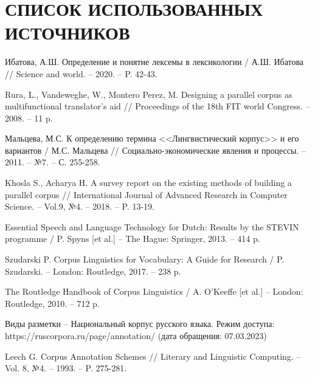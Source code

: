 \section*{СПИСОК ИСПОЛЬЗОВАННЫХ ИСТОЧНИКОВ}

\begingroup
\renewcommand{\section}[2]{}
\begin{thebibliography}{}
	Ибатова, А.Ш. Определение и понятие лексемы в лексикологии / А.Ш. Ибатова // Science and world. -- 2020. -- P. 42-43.
	
	Rura, L., Vandeweghe, W., Montero Perez, M. Designing a parallel corpus as multifunctional translator's aid // Proceedings of the 18th FIT world Congress. -- 2008. -- 11 p.
	
	Мальцева, М.С. К определению термина <<Лингвистический корпус>> и его вариантов / М.С. Мальцева // Социально-экономические явления и процессы. -- 2011. -- №7. -- С. 255-258.
	
	Khosla S., Acharya H. A survey report on the existing methods of building a parallel corpus // International Journal of Advanced Research in Computer Science. -- Vol.9, №4. -- 2018. -- P. 13-19.
	
	Essential Speech and Language Technology for Dutch: Results by the STEVIN programme / P. Spyns [et al.] -- The Hague: Springer, 2013. -- 414 p.
	
	Szudarski P. Corpus Linguistics for Vocabulary: A Guide for Research / P. Szudarski. -- London: Routledge, 2017. -- 238 p.
	
	The Routledge Handbook of Corpus Linguistics / A. O'Keeffe [et al.] -- London: Routledge, 2010. -- 712 p.
	
	Виды разметки -- Национальный корпус русского языка. Режим доступа: https://ruscorpora.ru/page/annotation/ (дата обращения: 07.03.2023)
	
	Leech G. Corpus Annotation Schemes // Literary and Linguistic Computing. -- Vol. 8, №4. -- 1993. -- P. 275-281.
	

\end{thebibliography}
